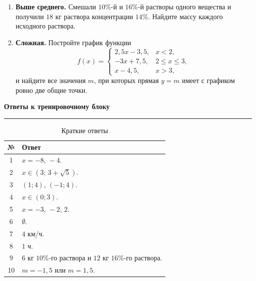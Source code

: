\documentclass[a4paper,12pt]{article}
\newcommand{\topic}[1]{%
  \vspace{0.8em}%
  {\Large\bfseries\color{darkaccent}#1}\par
  \vspace{0.25em}%
  {\color{accent}\rule{\linewidth}{0.6pt}}\par
  \vspace{0.45em}%
}
\begin{document}
\begin{enumerate}[label=\textbf{\arabic*.}]
\item
\textbf{Выше среднего.}
Смешали \(10\%\)-й и \(16\%\)-й растворы одного вещества и получили
\(18\) кг раствора концентрации \(14\%\).
Найдите массу каждого исходного раствора.

\item
\textbf{Сложная.}
Постройте график функции
\[
f(x)=
\begin{cases}
2{,}5x-3{,}5, & x<2,\\
-3x+7{,}5, & 2\le x\le3,\\
x-4{,}5, & x>3,
\end{cases}
\]
и найдите все значения \(m\), при которых прямая \(y=m\) имеет
с графиком ровно две общие точки.

\end{enumerate}


\clearpage

\topic{Ответы к тренировочному блоку}

\begin{table}[ht]
\centering
\caption{Краткие ответы}
\begin{tabularx}{\linewidth}{@{}cX@{}}
\toprule
\textbf{№} & \textbf{Ответ} \\
\midrule

1
&
\(x=-8,\,-4\).
\\

2
&
\(x\in(3;\,3+\sqrt5)\).
\\

3
&
\((1;4)\), \((-1;4)\).
\\

4
&
\(x\in(0;3)\).
\\

5
&
\(x=-3,\,-2,\,2\).
\\

6
&
\(\emptyset\).
\\

7
&
\(4\) км/ч.
\\

8
&
\(1\) ч.
\\

9
&
\(6\) кг \(10\%\)-го раствора и \(12\) кг \(16\%\)-го раствора.
\\

10
&
\(m=-1{,}5\) или \(m=1{,}5\).
\\

\bottomrule
\end{tabularx}
\end{table}
\end{document}
